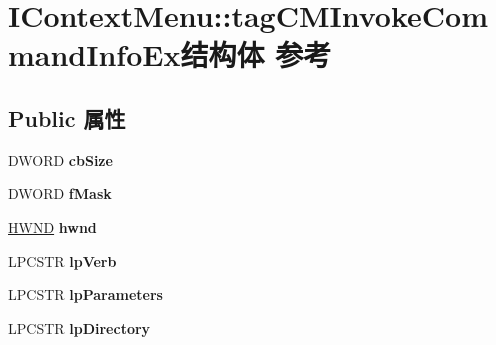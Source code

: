 \hypertarget{struct_i_context_menu_1_1tag_c_m_invoke_command_info_ex}{}\section{I\+Context\+Menu\+:\+:tag\+C\+M\+Invoke\+Command\+Info\+Ex结构体 参考}
\label{struct_i_context_menu_1_1tag_c_m_invoke_command_info_ex}
\subsection*{Public 属性}
\begin{DoxyCompactItemize}
\item 
\mbox{\label{struct_i_context_menu_1_1tag_c_m_invoke_command_info_ex_a77a58cebce46e5cf73708d8f02f896d0}} 
D\+W\+O\+RD {\bfseries cb\+Size}
\item 
\mbox{\label{struct_i_context_menu_1_1tag_c_m_invoke_command_info_ex_a6ba81ddc347d910ca67d24c1aa335aaa}} 
D\+W\+O\+RD {\bfseries f\+Mask}
\item 
\mbox{\label{struct_i_context_menu_1_1tag_c_m_invoke_command_info_ex_a4a264a2b6f459cfb0559c301f9178ef8}} 
\hyperlink{interfacevoid}{H\+W\+ND} {\bfseries hwnd}
\item 
\mbox{\label{struct_i_context_menu_1_1tag_c_m_invoke_command_info_ex_af546e8f5c458d722098e8e3ffdf0c0e4}} 
L\+P\+C\+S\+TR {\bfseries lp\+Verb}
\item 
\mbox{\label{struct_i_context_menu_1_1tag_c_m_invoke_command_info_ex_a377bee620d30cb875b2a0e70208c3a13}} 
L\+P\+C\+S\+TR {\bfseries lp\+Parameters}
\item 
\mbox{\label{struct_i_context_menu_1_1tag_c_m_invoke_command_info_ex_a88c236f7fdc1bf0dd82220f39c7a308b}} 
L\+P\+C\+S\+TR {\bfseries lp\+Directory}
\item 
\mbox{\label{struct_i_context_menu_1_1tag_c_m_invoke_command_info_ex_a894e2698a9b64f677be772a7ea094277}} 

\end{DoxyCompactItemize}
